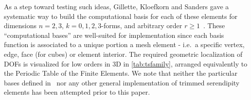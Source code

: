 \documentclass[format=acmsmall,screen,timestamp=false,a4paper]{acmart}
\newcommand\josh[1]{\textbf{\textcolor[rgb]{0,.5,1}{[Josh: #1]}}}
\newcommand{\calS}{\mathcal{S}}
\begin{document}
  

  

	As a step toward testing such ideas, Gillette, Kloefkorn and Sanders gave a systematic way to build the computational basis for each of these elements for dimensions $n = 2, 3$, $k=0, 1, 2, 3$-forms, and arbitrary order $r \geq 1$~\cite{gillette2019computational}.
	These ``computational bases'' are well-suited for implementation since each basis function is associated to a unique portion a mesh element - i.e.\ a specific vertex, edge, face (for cubes) or element interior.
	The required geometric localization of DOFs is visualized for low orders in 3D in \cref{tab:tsfamily}, arranged equivalently to the Periodic Table of the Finite Elements.
	We note that neither the particular bases defined in~\cite{gillette2019computational} nor any other general implementation of trimmed serendipity elements has been attempted prior to this paper.

	
	
  
\end{document}
